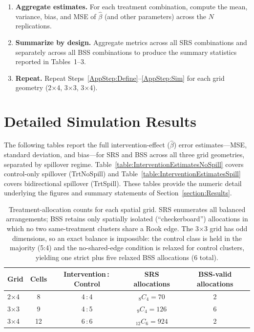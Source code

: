 \documentclass{article}[11pt]
\begin{document}
\begin{enumerate}
    \item \textbf{Aggregate estimates.} For each treatment combination, compute the mean, variance, bias, and MSE of $\hat\beta$ (and other parameters) across the $N$ replications.

    \item \textbf{Summarize by design.} Aggregate metrics across all SRS combinations and separately across all BSS combinations to produce the summary statistics reported in Tables~1--3.

    \item\label{AppStep:Repeat} \textbf{Repeat.} Repeat Steps~\ref{AppStep:Define}--\ref{AppStep:Sim} for each grid geometry (2$\times$4, 3$\times$3, 3$\times$4).
\end{enumerate}

\section{Detailed Simulation Results}\label{appendix:Results}

The following tables report the full intervention-effect ($\hat{\beta}$) error estimates---MSE, standard deviation, and bias---for SRS and BSS across all three grid geometries, separated by spillover regime. Table~\ref{table:InterventionEstimatesNoSpill} covers control-only spillover (TrtNoSpill) and Table~\ref{table:InterventionEstimatesSpill} covers bidirectional spillover (TrtSpill). These tables provide the numeric detail underlying the figures and summary statements of Section~\ref{section:Results}.

\begin{table}[ht!]
\centering
\begin{tabular}{l c c c c}
\toprule
Grid & Cells & Intervention\,:\,Control & SRS allocations & BSS-valid allocations \\
\midrule
2$\times$4 & 8 & 4\,:\,4 & $_{8}C_{4}=70$ & 2 \\
3$\times$3 & 9 & 4\,:\,5 & $_{9}C_{4}=126$ & 6 \\
3$\times$4 & 12 & 6\,:\,6 & $_{12}C_{6}=924$ & 2 \\
\bottomrule
\end{tabular}
\caption{Treatment-allocation counts for each spatial grid. SRS enumerates all balanced arrangements; BSS retains only spatially isolated (``checkerboard'') allocations in which no two same-treatment clusters share a Rook edge. The 3$\times$3 grid has odd dimensions, so an exact balance is impossible: the control class is held in the majority (5:4) and the no-shared-edge condition is relaxed for control clusters, yielding one strict plus five relaxed BSS allocations (6 total).}
\label{table:AllocationCounts}
\end{table}
\end{document}
